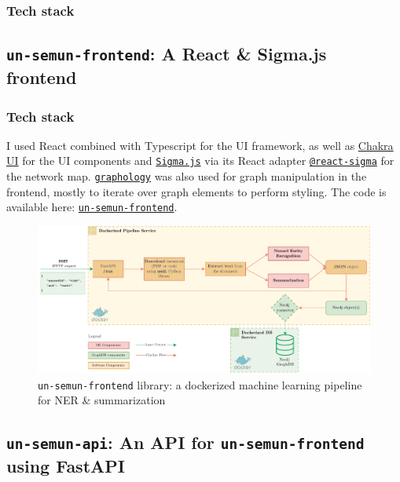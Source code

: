 \documentclass[11pt]{article}
\begin{document}
\subsubsection*{Tech stack}

\subsection{\texttt{un-semun-frontend}: A React \& Sigma.js frontend}
\subsubsection*{Tech stack}

I used React combined with Typescript for the UI framework, as well as \href{https://chakra-ui.com/}{Chakra UI} for the UI components and \href{https://www.sigmajs.org/}{\texttt{Sigma.js}} via its React adapter \href{https://sim51.github.io/react-sigma/}{\texttt{@react-sigma}} for the network map. \href{https://graphology.github.io/}{\texttt{graphology}} was also used for graph manipulation in the frontend, mostly to iterate over graph elements to perform styling. The code is available here: \href{https://github.com/ClementSicard/un-semun-frontend}{\faGithub{} \texttt{un-semun-frontend}}.



\begin{figure}[!htb]
    \centering

    \includegraphics[width=\textwidth]{res/ml-pipeline.pdf}
    \caption{\texttt{un-semun-frontend} library: a dockerized machine learning pipeline for NER \& summarization}

    \label{fig:frontend-screenshot}
\end{figure}


\subsection{\texttt{un-semun-api}: An API for \texttt{un-semun-frontend} using FastAPI}
\end{document}
